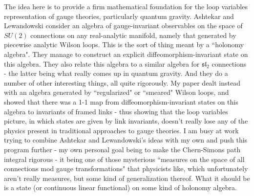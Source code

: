 The idea here is to provide a firm mathematical foundation for the loop variables representation of gauge theories, particularly quantum gravity. Ashtekar and Lewandowski consider an algebra of gauge-invariant observables on the space of $SU(2)$ connections on any real-analytic manifold, namely that generated by piecewise analytic Wilson loops. This is the sort of thing meant by a ``holonomy algebra". They manage to construct an explicit diffeomorphism-invariant state on this algebra. They also relate this algebra to a similar algebra for $\mathfrak{sl}_2$ connections - the latter being what really comes up in quantum gravity. And they do a number of other interesting things, all quite rigorously. My paper dealt instead with an algebra generated by ``regularized" or ``smeared" Wilson loops, and showed that there was a 1-1 map from diffeomorphism-invariant states on this algebra to invariants of framed links - thus showing that the loop variables picture, in which states are given by link invariants, doesn't really lose any of the physics present in traditional approaches to gauge theories. I am busy at work trying to combine Ashtekar and Lewandowski's ideas with my own and push this program further - my own personal goal being to make the Chern-Simons path integral rigorous - it being one of those mysterious ``measures on the space of all connections mod gauge transformations" that physicists like, which unfortunately aren't really measures, but some kind of generalization thereof. What it should be is a state (or continuous linear functional) on some kind of holonomy algebra. 
